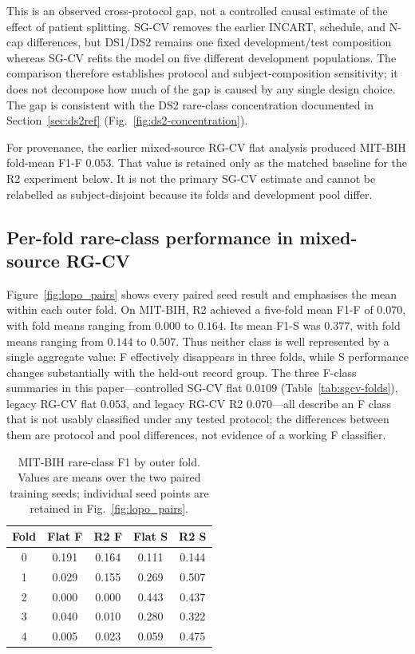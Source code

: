 \documentclass[review,12pt]{elsarticle}
\begin{document}
This is an observed cross-protocol gap, not a controlled causal estimate of the
effect of patient splitting. SG-CV removes the earlier INCART, schedule, and N-cap
differences, but DS1/DS2 remains one fixed development/test composition whereas
SG-CV refits the model on five different development populations. The comparison
therefore establishes protocol and subject-composition sensitivity; it does not
decompose how much of the gap is caused by any single design choice. The gap is
consistent with the DS2 rare-class concentration documented in
Section~\ref{sec:ds2ref} (Fig.~\ref{fig:ds2-concentration}).

For provenance, the earlier mixed-source RG-CV flat analysis produced MIT-BIH
fold-mean F1-F $0.053$. That value is retained only as the matched baseline for
the R2 experiment below. It is not the primary SG-CV estimate and cannot be
relabelled as subject-disjoint because its folds and development pool differ.

\subsection{Per-fold rare-class performance in mixed-source RG-CV}
Figure~\ref{fig:lopo_pairs} shows every paired seed result and emphasises the
mean within each outer fold. On MIT-BIH, R2 achieved a five-fold mean F1-F of
$0.070$, with fold means ranging from $0.000$ to $0.164$. Its mean F1-S was
$0.377$, with fold means ranging from $0.144$ to $0.507$. Thus neither class is
well represented by a single aggregate value: F effectively disappears in
three folds, while S performance changes substantially with the held-out record
group. The three F-class summaries in this paper---controlled SG-CV flat
$0.0109$ (Table~\ref{tab:sgcv-folds}), legacy RG-CV flat $0.053$, and legacy
RG-CV R2 $0.070$---all describe an F class that is not usably classified under
any tested protocol; the differences between them are protocol and pool
differences, not evidence of a working F classifier.

\begin{table}[htbp]
\caption{MIT-BIH rare-class F1 by outer fold. Values are means over the two
paired training seeds; individual seed points are retained in
Fig.~\ref{fig:lopo_pairs}.}
\label{tab:lopo-fold-f1}
\centering
\begin{tabular}{@{}ccccc@{}}
\toprule
Fold & Flat F & R2 F & Flat S & R2 S \\
\midrule
0 & 0.191 & 0.164 & 0.111 & 0.144 \\
1 & 0.029 & 0.155 & 0.269 & 0.507 \\
2 & 0.000 & 0.000 & 0.443 & 0.437 \\
3 & 0.040 & 0.010 & 0.280 & 0.322 \\
4 & 0.005 & 0.023 & 0.059 & 0.475 \\
\bottomrule
\end{tabular}
\end{table}
\end{document}
